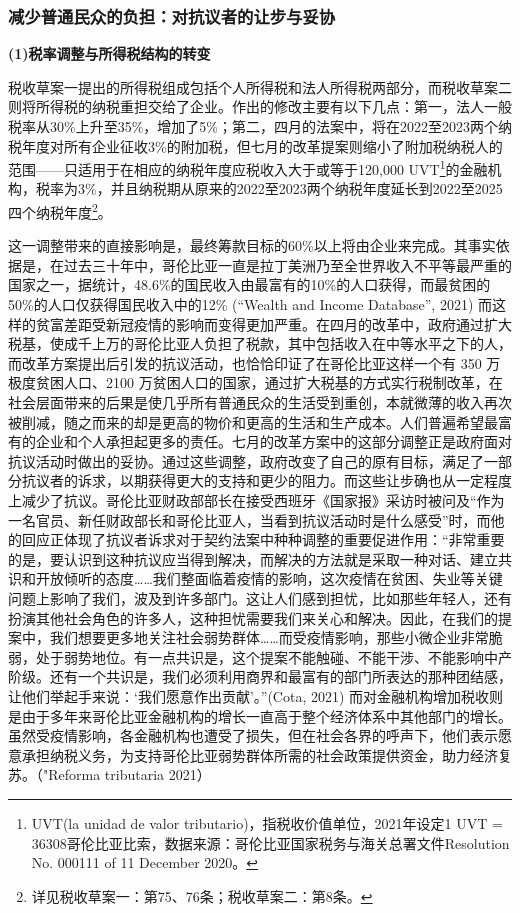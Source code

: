 \documentclass{phyasgn}\usepackage{nag}
\begin{document}
\subsubsection{减少普通民众的负担：对抗议者的让步与妥协}
\par \textbf{(1)税率调整与所得税结构的转变}
\par 税收草案一提出的所得税组成包括个人所得税和法人所得税两部分，而税收草案二则将所得税的纳税重担交给了企业。作出的修改主要有以下几点：第一，法人一般税率从30\%上升至35\%，增加了5\%；第二，四月的法案中，将在2022至2023两个纳税年度对所有企业征收3\%的附加税，但七月的改革提案则缩小了附加税纳税人的范围——只适用于在相应的纳税年度应税收入大于或等于120,000 UVT\footnote[25]{UVT(la unidad de valor tributario)，指税收价值单位，2021年设定1 UVT = 36308哥伦比亚比索，数据来源：哥伦比亚国家税务与海关总署文件Resolution No. 000111 of 11 December 2020。}的金融机构，税率为3\%，并且纳税期从原来的2022至2023两个纳税年度延长到2022至2025四个纳税年度\footnote[26]{详见税收草案一：第75、76条；税收草案二：第8条。}。
\par 这一调整带来的直接影响是，最终筹款目标的60\%以上将由企业来完成。其事实依据是，在过去三十年中，哥伦比亚一直是拉丁美洲乃至全世界收入不平等最严重的国家之一，据统计，48.6\%的国民收入由最富有的10\%的人口获得，而最贫困的50\%的人口仅获得国民收入中的12\% (“Wealth and Income Database”, 2021) 而这样的贫富差距受新冠疫情的影响而变得更加严重。在四月的改革中，政府通过扩大税基，使成千上万的哥伦比亚人负担了税款，其中包括收入在中等水平之下的人，而改革方案提出后引发的抗议活动，也恰恰印证了在哥伦比亚这样一个有 350 万极度贫困人口、2100 万贫困人口的国家，通过扩大税基的方式实行税制改革，在社会层面带来的后果是使几乎所有普通民众的生活受到重创，本就微薄的收入再次被削减，随之而来的却是更高的物价和更高的生活和生产成本。人们普遍希望最富有的企业和个人承担起更多的责任。七月的改革方案中的这部分调整正是政府面对抗议活动时做出的妥协。通过这些调整，政府改变了自己的原有目标，满足了一部分抗议者的诉求，以期获得更大的支持和更少的阻力。而这些让步确也从一定程度上减少了抗议。哥伦比亚财政部部长在接受西班牙《国家报》采访时被问及“作为一名官员、新任财政部长和哥伦比亚人，当看到抗议活动时是什么感受”时，而他的回应正体现了抗议者诉求对于契约法案中种种调整的重要促进作用：“非常重要的是，要认识到这种抗议应当得到解决，而解决的方法就是采取一种对话、建立共识和开放倾听的态度……我们整面临着疫情的影响，这次疫情在贫困、失业等关键问题上影响了我们，波及到许多部门。这让人们感到担忧，比如那些年轻人，还有扮演其他社会角色的许多人，这种担忧需要我们来关心和解决。因此，在我们的提案中，我们想要更多地关注社会弱势群体……而受疫情影响，那些小微企业非常脆弱，处于弱势地位。有一点共识是，这个提案不能触碰、不能干涉、不能影响中产阶级。还有一个共识是，我们必须利用商界和最富有的部门所表达的那种团结感，让他们举起手来说：‘我们愿意作出贡献’。”(Cota, 2021) 而对金融机构增加税收则是由于多年来哥伦比亚金融机构的增长一直高于整个经济体系中其他部门的增长。虽然受疫情影响，各金融机构也遭受了损失，但在社会各界的呼声下，他们表示愿意承担纳税义务，为支持哥伦比亚弱势群体所需的社会政策提供资金，助力经济复苏。（"Reforma tributaria 2021）
\end{document}
